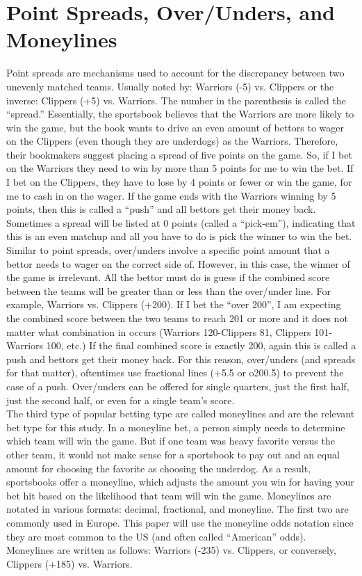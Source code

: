 \documentclass [MS] {uclathes}
\begin{document}
\section{Point Spreads, Over/Unders, and Moneylines}
Point spreads are mechanisms used to account for the discrepancy between two unevenly matched teams. Usually noted by: Warriors (-5) vs. Clippers or the inverse: Clippers (+5) vs. Warriors. The number in the parenthesis is called the ``spread.'' Essentially, the sportsbook believes that the Warriors are more likely to win the game, but the book wants to drive an even amount of bettors to wager on the Clippers (even though they are underdogs) as the Warriors. Therefore, their bookmakers suggest placing a spread of five points on the game. So, if I bet on the Warriors they need to win by more than 5 points for me to win the bet. If I bet on the Clippers, they have to lose by 4 points or fewer or win the game, for me to cash in on the wager. If the game ends with the Warriors winning by 5 points, then this is called a ``push'' and all bettors get their money back. Sometimes a spread will be listed at 0 points (called a ``pick-em''), indicating that this is an even matchup and all you have to do is pick the winner to win the bet.\\

\noindent Similar to point spreads, over/unders involve a specific point amount that a bettor needs to wager on the correct side of. However, in this case, the winner of the game is irrelevant. All the bettor must do is guess if the combined score between the teams will be greater than or less than the over/under line. For example, Warriors vs. Clippers (+200). If I bet the ``over 200'', I am expecting the combined score between the two teams to reach 201 or more and it does not matter what combination in occurs (Warriors 120-Clippers 81, Clippers 101-Warriors 100, etc.) If the final combined score is exactly 200, again this is called a push and bettors get their money back. For this reason, over/unders (and spreads for that matter), oftentimes use fractional lines (+5.5 or o200.5) to prevent the case of a push. Over/unders can be offered for single quarters, just the first half, just the second half, or even for a single team's score.\\

\noindent The third type of popular betting type are called moneylines and are the relevant bet type for this study. In a moneyline bet, a person simply needs to determine which team will win the game. But if one team was heavy favorite versus the other team, it would not make sense for a sportsbook to pay out and an equal amount for choosing the favorite as choosing the underdog. As a result, sportsbooks offer a moneyline, which adjusts the amount you win for having your bet hit based on the likelihood that team will win the game. Moneylines are notated in various formats: decimal, fractional, and moneyline. The first two are commonly used in Europe. This paper will use the moneyline odds notation since they are most common to the US (and often called ``American'' odds). Moneylines are written as follows: Warriors (-235) vs. Clippers, or conversely, Clippers (+185) vs. Warriors. \\
\end{document}
